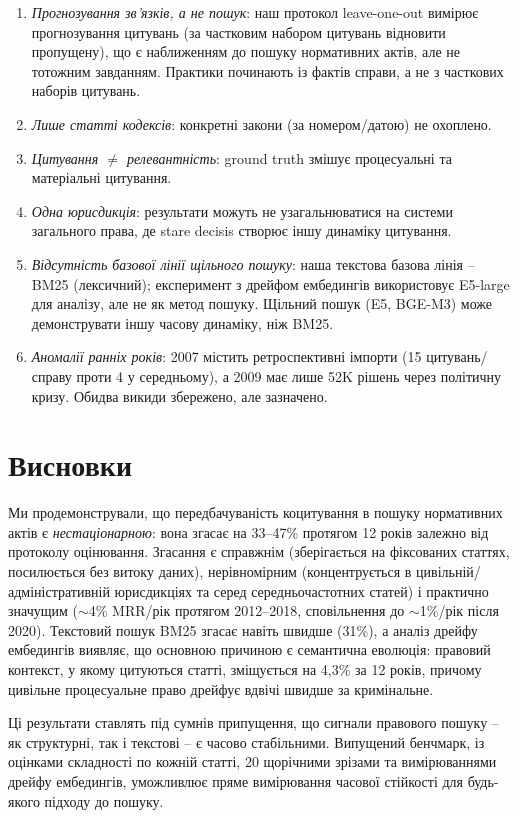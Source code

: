 \begin{enumerate}[nosep,leftmargin=*]
  \item \emph{Прогнозування зв'язків, а не пошук}: наш протокол leave-one-out вимірює прогнозування цитувань (за частковим набором цитувань відновити пропущену), що є наближенням до пошуку нормативних актів, але не тотожним завданням. Практики починають із фактів справи, а не з часткових наборів цитувань.
  \item \emph{Лише статті кодексів}: конкретні закони (за номером/датою) не охоплено.
  \item \emph{Цитування $\neq$ релевантність}: ground truth змішує процесуальні та матеріальні цитування.
  \item \emph{Одна юрисдикція}: результати можуть не узагальнюватися на системи загального права, де stare decisis створює іншу динаміку цитування.
  \item \emph{Відсутність базової лінії щільного пошуку}: наша текстова базова лінія -- BM25 (лексичний); експеримент з дрейфом ембедингів використовує E5-large для аналізу, але не як метод пошуку. Щільний пошук (E5, BGE-M3) може демонструвати іншу часову динаміку, ніж BM25.
  \item \emph{Аномалії ранніх років}: 2007 містить ретроспективні імпорти (15 цитувань/справу проти 4 у середньому), а 2009 має лише 52K рішень через політичну кризу. Обидва викиди збережено, але зазначено.
\end{enumerate}

\section{Висновки}
\label{sec:conclusion}

Ми продемонстрували, що передбачуваність коцитування в пошуку нормативних актів є \emph{нестаціонарною}: вона згасає на 33--47\% протягом 12 років залежно від протоколу оцінювання.
Згасання є справжнім (зберігається на фіксованих статтях, посилюється без витоку даних), нерівномірним (концентрується в цивільній/адміністративній юрисдикціях та серед середньочастотних статей) і практично значущим ($\sim$4\% MRR/рік протягом 2012--2018, сповільнення до $\sim$1\%/рік після 2020).
Текстовий пошук BM25 згасає навіть швидше (31\%), а аналіз дрейфу ембедингів виявляє, що основною причиною є семантична еволюція: правовий контекст, у якому цитуються статті, зміщується на 4{,}3\% за 12 років, причому цивільне процесуальне право дрейфує вдвічі швидше за кримінальне.

Ці результати ставлять під сумнів припущення, що сигнали правового пошуку -- як структурні, так і текстові -- є часово стабільними.
Випущений бенчмарк, із оцінками складності по кожній статті, 20 щорічними зрізами та вимірюваннями дрейфу ембедингів, уможливлює пряме вимірювання часової стійкості для будь-якого підходу до пошуку.

